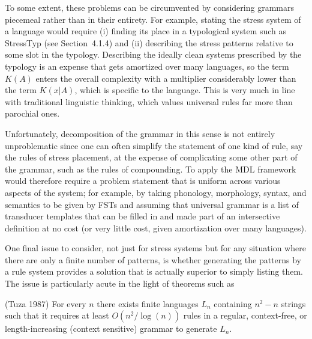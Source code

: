 To some extent, these problems can be circumvented by considering grammars
piecemeal rather than in their entirety. For example, stating the stress
system of a language would require (i) finding its place in a typological
system such as StressTyp (see Section~4.1.4) and (ii) describing the stress
patterns relative to some slot in the typology.  Describing the ideally clean
systems prescribed by the typology is an expense that gets amortized over many
languages, so the term $K(A)$ enters the overall complexity with a multiplier
considerably lower than the term $K(x|A)$, which is specific to the
language. This is very much in line with traditional linguistic thinking,
which values universal rules far more than parochial ones.

Unfortunately, decomposition of the grammar in this sense is not entirely
unproblematic since one can often simplify the statement of one kind of rule,
say the rules of stress placement, at the expense of complicating some other
part of the grammar, such as the rules of compounding. To apply the MDL
framework would therefore require a problem statement that is uniform across
various aspects of the system; for example, by taking phonology, morphology,
syntax, and semantics to be given by FSTs and assuming that universal grammar
is a list of transducer templates that can be filled in and made part of an
intersective definition at no cost (or very little cost, given amortization
over many languages). 

One final issue to consider, not just for stress systems but for any situation
where there are only a finite number of patterns, is whether generating the
patterns by a rule system provides a solution that is actually superior to
simply listing them. The issue is particularly acute in the light of theorems
such as

\smallskip{} (Tuza 1987) For every $n$ there exists
finite languages $L_n$ containing $n^2 -n$ strings such that it requires at
least $O(n^2/\log(n))$ rules in a regular, context-free, or length-increasing
(context sensitive) grammar to generate $L_n$. 

